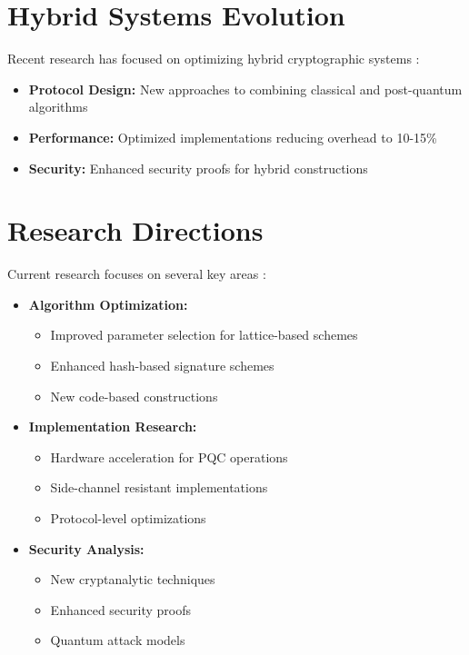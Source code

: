 \section{Hybrid Systems Evolution}\label{sec:hybrid_ch8}

Recent research has focused on optimizing hybrid cryptographic systems \parencite{hybrid_systems_2024}:

\begin{itemize}
    \item \textbf{Protocol Design:} New approaches to combining classical and post-quantum algorithms \parencite{hybrid_protocols_2024}
    \item \textbf{Performance:} Optimized implementations reducing overhead to 10-15\% \parencite{hybrid_performance_2024}
    \item \textbf{Security:} Enhanced security proofs for hybrid constructions \parencite{hybrid_security_2024}
\end{itemize}

\section{Research Directions}\label{sec:research_ch8}

Current research focuses on several key areas \parencite{pqc_research_2024}:

\begin{itemize}
    \item \textbf{Algorithm Optimization:}
        \begin{itemize}
            \item Improved parameter selection for lattice-based schemes \parencite{lattice_optimization_2024}
            \item Enhanced hash-based signature schemes \parencite{hash_optimization_2024}
            \item New code-based constructions \parencite{code_based_2024}
        \end{itemize}
    \item \textbf{Implementation Research:}
        \begin{itemize}
            \item Hardware acceleration for PQC operations \parencite{hardware_acceleration_2024}
            \item Side-channel resistant implementations \parencite{side_channel_2024}
            \item Protocol-level optimizations \parencite{protocol_optimization_2024}
        \end{itemize}
    \item \textbf{Security Analysis:}
        \begin{itemize}
            \item New cryptanalytic techniques \parencite{cryptanalysis_2024}
            \item Enhanced security proofs \parencite{security_proofs_2024}
            \item Quantum attack models \parencite{quantum_attacks_2024}
        \end{itemize}
\end{itemize}

